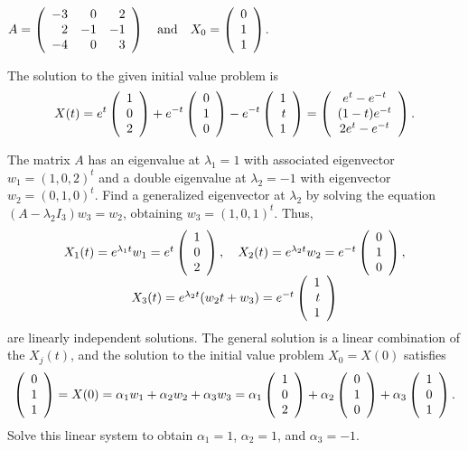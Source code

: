 \documentclass{ximera}
\begin{document}
\begin{computerExercise}  \label{c12.1.10b}
$A=\left(\begin{array}{rrr}
    -3   &  0   &  2\\
     2   & -1   & -1\\
    -4   &  0   &  3
\end{array}\right) \quad\mbox{and}\quad 
X_0=\left(\begin{array}{r} 0 \\ 1 \\ 1  \end{array}\right)$.

\begin{solution}
\ans The solution to the given initial value problem is
\[
X(t) = e^t\left(\begin{array}{r} 1 \\ 0 \\ 2\end{array}\right) + e^{-t}\left(\begin{array}{r} 0 \\ 1 \\ 0\end{array}\right) -
e^{-t}\left(\begin{array}{r} 1 \\ t \\ 1\end{array}\right) =
\left(\begin{array}{c} e^t - e^{-t} \\ (1 - t)e^{-t} \\ 2e^t - e^{-t}\end{array}\right).
\]

\soln The matrix $A$ has an eigenvalue at $\lambda_1 = 1$ with associated
eigenvector $w_1 = (1,0,2)^t$ and a double eigenvalue at $\lambda_2 = -1$
with eigenvector $w_2 = (0,1,0)^t$.  Find a generalized eigenvector at
$\lambda_2$ by solving the equation $(A - \lambda_2I_3)w_3 = w_2$, obtaining
$w_3 = (1,0,1)^t$.  Thus,
\[
\begin{array}{c}
X_1(t) = e^{\lambda_1 t}w_1 = e^{t}\left(\begin{array}{r} 1 \\ 0 \\ 2\end{array}\right), \quad
X_2(t) = e^{\lambda_2 t}w_2 = e^{-t}\left(\begin{array}{r} 0 \\ 1 \\ 0\end{array}\right), \\
X_3(t) = e^{\lambda_2 t}(w_2t + w_3) = e^{-t}\left(\begin{array}{r} 1 \\ t \\ 1\end{array}\right)
\end{array}
\]
are linearly independent solutions.  The general solution is a linear
combination of the $X_j(t)$, and the solution to the initial value
problem $X_0 = X(0)$ satisfies
\[
\left(\begin{array}{r} 0 \\ 1 \\ 1\end{array}\right) = X(0) = \alpha_1w_1 + \alpha_2w_2 + \alpha_3w_3
= \alpha_1\left(\begin{array}{r} 1 \\ 0 \\ 2\end{array}\right) + \alpha_2\left(\begin{array}{r} 0 \\ 1 \\ 0\end{array}\right)
+ \alpha_3\left(\begin{array}{r} 1 \\ 0 \\ 1\end{array}\right).
\]
Solve this linear system to obtain $\alpha_1 = 1$,
$\alpha_2 = 1$, and $\alpha_3 = -1$.

\end{solution}
\end{computerExercise}
\end{document}
